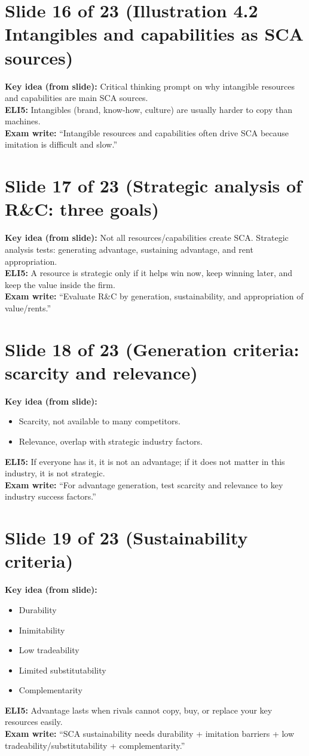 \documentclass[11pt,a4paper]{article}
\begin{document}
\section*{Slide 16 of 23 (Illustration 4.2 Intangibles and capabilities as SCA sources)}
\textbf{Key idea (from slide):} Critical thinking prompt on why intangible resources and capabilities are main SCA sources.\\
\textbf{ELI5:} Intangibles (brand, know-how, culture) are usually harder to copy than machines.\\
\textbf{Exam write:} ``Intangible resources and capabilities often drive SCA because imitation is difficult and slow.''

\section*{Slide 17 of 23 (Strategic analysis of R\&C: three goals)}
\textbf{Key idea (from slide):} Not all resources/capabilities create SCA. Strategic analysis tests: generating advantage, sustaining advantage, and rent appropriation.\\
\textbf{ELI5:} A resource is strategic only if it helps win now, keep winning later, and keep the value inside the firm.\\
\textbf{Exam write:} ``Evaluate R\&C by generation, sustainability, and appropriation of value/rents.''

\section*{Slide 18 of 23 (Generation criteria: scarcity and relevance)}
\textbf{Key idea (from slide):}
\begin{itemize}
  \item Scarcity, not available to many competitors.
  \item Relevance, overlap with strategic industry factors.
\end{itemize}
\textbf{ELI5:} If everyone has it, it is not an advantage; if it does not matter in this industry, it is not strategic.\\
\textbf{Exam write:} ``For advantage generation, test scarcity and relevance to key industry success factors.''

\section*{Slide 19 of 23 (Sustainability criteria)}
\textbf{Key idea (from slide):}
\begin{itemize}
  \item Durability
  \item Inimitability
  \item Low tradeability
  \item Limited substitutability
  \item Complementarity
\end{itemize}
\textbf{ELI5:} Advantage lasts when rivals cannot copy, buy, or replace your key resources easily.\\
\textbf{Exam write:} ``SCA sustainability needs durability + imitation barriers + low tradeability/substitutability + complementarity.''
\end{document}
